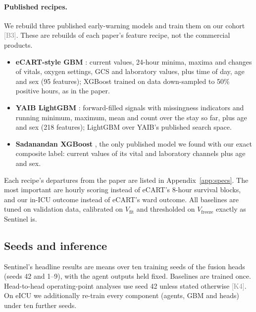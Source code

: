 \documentclass[11pt]{article}
\newcommand{\ev}[1]{\textcolor{gray}{\scriptsize[#1]}}   %
\begin{document}
\paragraph{Published recipes.} We rebuild three published early-warning
models and train them on our cohort \ev{B3}. These are rebuilds of each
paper's feature recipe, not the commercial products.
\begin{itemize}
  \item \textbf{eCART-style GBM} \cite{churpek2025ecartv5}: current values,
        24-hour minima, maxima and changes of vitals, oxygen settings, GCS and
        laboratory values, plus time of day, age and sex (95 features);
        XGBoost trained on data down-sampled to 50\% positive hours, as in the
        paper.
  \item \textbf{YAIB LightGBM} \cite{vandewater2024yaib}: forward-filled
        signals with missingness indicators and running minimum, maximum,
        mean and count over the stay so far, plus age and sex (218 features);
        LightGBM over YAIB's published search space.
  \item \textbf{Sadanandan XGBoost} \cite{sadanandan2026multimodal}, the only
        published model we found with our exact composite label: current
        values of its vital and laboratory channels plus age and sex.
\end{itemize}
Each recipe's departures from the paper are listed in
Appendix~\ref{app:specs}. The most important are hourly scoring instead of
eCART's 8-hour survival blocks, and our in-ICU outcome instead of eCART's
ward outcome. All baselines are tuned on validation data, calibrated on
$V_{\text{fit}}$ and thresholded on $V_{\text{freeze}}$ exactly as Sentinel is.

\subsection{Seeds and inference}
Sentinel's headline results are means over ten training seeds of the fusion
heads (seeds 42 and 1--9), with the agent outputs held fixed. Baselines are
trained once. Head-to-head operating-point analyses use seed 42 unless stated
otherwise \ev{K4}. On eICU we additionally re-train every component (agents,
GBM and heads) under ten further seeds.
\end{document}
